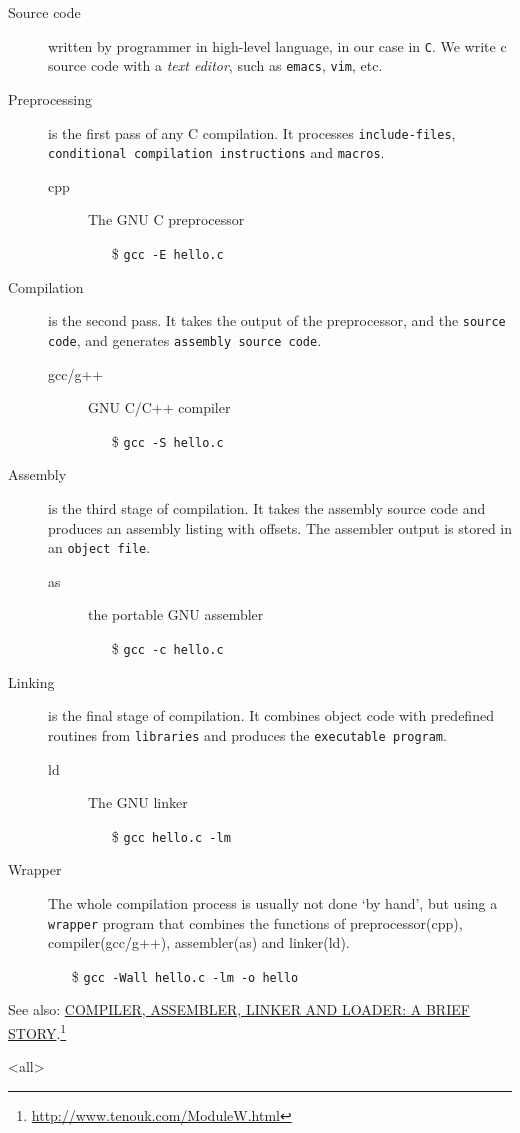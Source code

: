 \begin{description}
\item[Source code] written by programmer in high-level language, in our case in
  \texttt{C}. We write c source code with a \emph{text editor}, such as \texttt{emacs},
  \texttt{vim}, etc.
\item[Preprocessing] is the first pass of any C compilation. It processes
  \texttt{include-files}, \texttt{conditional compilation instructions} and
  \texttt{macros}.
  \begin{description}
  \item[cpp] The GNU C preprocessor
    \begin{itemize}
    \item[\$] \texttt{gcc -E hello.c}
    \end{itemize}
  \end{description}
\item[{Compilation}] is the second pass. It takes the output of the preprocessor, and the
  \texttt{source code}, and generates \texttt{assembly source code}.
  \begin{description}
  \item[gcc/g++] GNU C/C++ compiler
    \begin{itemize}
    \item[\$] \texttt{gcc -S hello.c}
    \end{itemize}
  \end{description}
\item[Assembly] is the third stage of compilation. It takes the assembly source code and
  produces an assembly listing with offsets. The assembler output is stored in an
  \texttt{object file}.
  \begin{description}
  \item[as] the portable GNU assembler
    \begin{itemize}
    \item[\$] \texttt{gcc -c hello.c}
    \end{itemize}
  \end{description}
\item[Linking] is the final stage of compilation. It combines object code with predefined
  routines from \texttt{libraries} and produces the \texttt{executable program}.
  \begin{description}
  \item[ld] The GNU linker
    \begin{itemize}
    \item[\$] \texttt{gcc hello.c -lm}
    \end{itemize}
  \end{description}
\item[{Wrapper}] The whole compilation process is usually not done `by hand', but using a
  \texttt{wrapper} program that combines the functions of preprocessor(cpp),
  compiler(gcc/g++), assembler(as) and linker(ld).
  \begin{itemize}
  \item[\$] \texttt{gcc -Wall hello.c -lm -o hello}
  \end{itemize}
\end{description}

See also: \href{http://www.tenouk.com/ModuleW.html}{COMPILER, ASSEMBLER, LINKER AND LOADER:
A BRIEF STORY}.\footnote{\url{http://www.tenouk.com/ModuleW.html}}

\mode<all>
